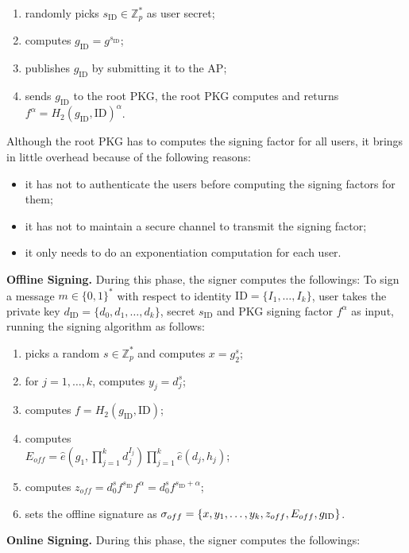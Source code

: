 \documentclass[times]{secauth}
\theoremstyle{definition}
\theoremstyle{remark}
\begin{document}
\begin{enumerate}
\item randomly picks $s_{\mathrm{ID}} \in \mathbb{Z}_p^*$ as user secret;
\item computes $g_{\mathrm{ID}} = g^{s_{\mathrm{ID}}}$;
\item publishes $g_{\mathrm{ID}}$ by submitting it to the AP;
\item sends $g_{\mathrm{ID}}$ to the root PKG, the root PKG computes and returns $f^\alpha = H_2(g_\mathrm{ID}, \mathrm{ID})^\alpha$. 
\end{enumerate}
Although the root PKG has to computes the signing factor for all users, it brings in little overhead because of the following reasons:
\begin{itemize}
\item it has not to authenticate the users before computing the signing factors for them;
\item it has not to maintain a secure channel to transmit the signing factor;
\item it only needs to do an exponentiation computation for each user.
\end{itemize}
\textbf{Offline Signing.} 
During this phase, the signer computes the followings:
To sign a message $m \in \{0, 1\}^*$ with respect to identity $\mathrm{ID} = \{I_1, \ldots, I_k\}$, user takes the private key $d_{\mathrm{ID}} = \{d_0, d_1, \ldots, d_k\}$, secret $s_{\mathrm{ID}}$ and PKG signing factor $f^\alpha$ as input, running the signing algorithm as follows:
\begin{enumerate}
\item picks a random $s \in \mathbb{Z}_p^*$ and computes $x = g_2^s$;
\item for $j = 1, \ldots, k$, computes $y_j = d_j^{s}$;
\item computes $f = H_2(g_\mathrm{ID}, \mathrm{ID})$;
\item computes\\$E_{off} = \hat{e}(g_1, \prod_{j=1}^{k} d_j^{I_j})\prod_{j=1}^{k} \hat{e}(d_j, h_j)$;
\item computes $z_{off} = d_0^sf^{s_\mathrm{ID}} f^\alpha = d_0^sf^{s_\mathrm{ID} + \alpha}$;
\item sets the offline signature as $\sigma_{off} = \{x, y_1, \ldots, y_k, \\z_{off}, E_{off}, g_{\mathrm{ID}}\}$.
\end{enumerate}
\textbf{Online Signing.}
During this phase, the signer computes the followings:
\end{document}
